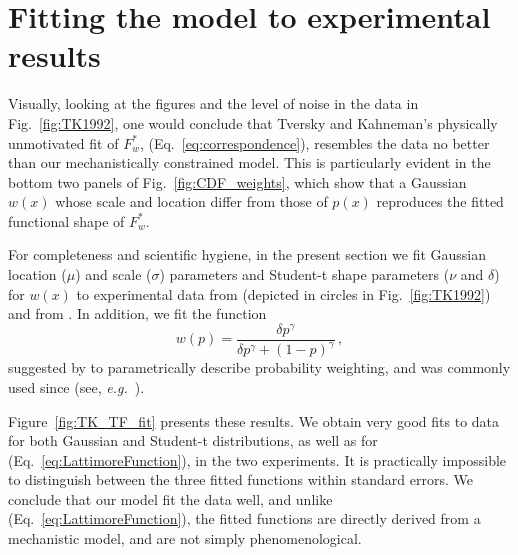\documentclass[a4paper, 12pt]{article}
\newcommand{\elabel}[1]{\label{eq:#1}}
\newcommand{\eref}[1]{(Eq.~\ref{eq:#1})}
\newcommand{\fref}[1]{Fig.~\ref{fig:#1}}
\newcommand{\Fref}[1]{Figure~\ref{fig:#1}}
\newcommand{\seclabel}[1]{\label{sec:#1}}
\newcommand{\eg}{{\it e.g.}\ }
\newcommand{\be}{\begin{equation}}
\newcommand{\ee}{\end{equation}}
\begin{document}
\section{Fitting the model to experimental results \seclabel{Fitting_the}}

Visually, looking at the figures and the level of noise in the data in \fref{TK1992}, one would conclude that Tversky and Kahneman's physically unmotivated fit of  $F^*_w$, \eref{correspondence}, resembles the data no better than our mechanistically constrained model.
This is particularly evident in the bottom two panels of \fref{CDF_weights}, which show that a Gaussian $w(x)$ whose scale and location differ from those of $p(x)$ reproduces the fitted functional shape of $F^*_w$.

For completeness and scientific hygiene, in the present section we fit Gaussian location ($\mu$) and scale ($\sigma$) parameters and Student-t shape parameters ($\nu$ and $\delta$) for $w(x)$ to experimental data from \cite{TverskyKahneman1992} (depicted in circles in \fref{TK1992}) and from \cite{TverskyFox1995}. In addition, we fit the function
%
\be
w(p)=\frac{\delta p^{\gamma}}{\delta p^{\gamma} + (1-p)^{\gamma}}\,,
\elabel{LattimoreFunction}
\ee
%
suggested by \cite{LattimoreBakerWitte1992} to parametrically describe probability weighting, and was commonly used since (see, \eg \cite{tversky1995risk}).

\Fref{TK_TF_fit} presents these results. We obtain very good fits to data for both Gaussian and Student-t distributions, as well as for \eref{LattimoreFunction}, in the two experiments. It is practically impossible to distinguish between the three fitted functions within standard errors. We conclude that our model fit the data well, and unlike \eref{LattimoreFunction}, the fitted functions are directly derived from a mechanistic model, and are not simply phenomenological.
\end{document}

